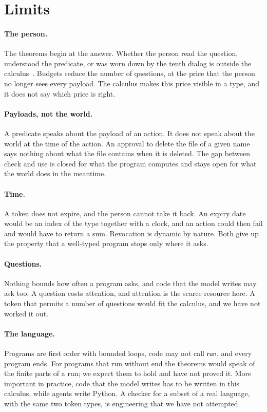 \documentclass[acmsmall,nonacm,screen]{acmart}
\newcommand{\kw}[1]{\mathsf{#1}}
\begin{document}
\section{Limits}
\label{sec:limits}

\paragraph{The person.} The theorems begin at the answer. Whether the person read the
question, understood the predicate, or was worn down by the tenth dialog is outside the
calculus~\citep{felt2012}. Budgets reduce the number of questions, at the price that the
person no longer sees every payload. The calculus makes this price visible in a type, and it
does not say which price is right.

\paragraph{Payloads, not the world.} A predicate speaks about the payload of an action. It
does not speak about the world at the time of the action. An approval to delete the file of a
given name says nothing about what the file contains when it is deleted. The gap between check
and use is closed for what the program computes and stays open for what the world does in the
meantime.

\paragraph{Time.} A token does not expire, and the person cannot take it back. An expiry date
would be an index of the type together with a clock, and an action could then fail and would
have to return a sum. Revocation is dynamic by nature. Both give up the property that a
well-typed program stops only where it asks.

\paragraph{Questions.} Nothing bounds how often a program asks, and code that the model writes
may ask too. A question costs attention, and attention is the scarce resource here. A token
that permits a number of questions would fit the calculus, and we have not worked it out.

\paragraph{The language.} Programs are first order with bounded loops, code may not call
$\kw{run}$, and every program ends. For programs that run without end the theorems would
speak of the finite parts of a run; we expect them to hold and have not proved it. More
important in practice, code that the model writes has to be written in this calculus, while
agents write Python. A checker for a subset of a real language, with the same two token types,
is engineering that we have not attempted.
\end{document}
